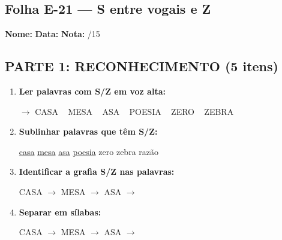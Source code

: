 \subsection{Folha E-21 --- S entre vogais e Z}
\begin{exercicio}



\noindent\textbf{Nome:} \underline{\hspace{3.2cm}} \quad \textbf{Data:} \underline{\hspace{1.6cm}} \quad \textbf{Nota:} \underline{\hspace{0.9cm}}/15


\subsection*{PARTE 1: RECONHECIMENTO (5 itens)}

\begin{enumerate}

  \item \textbf{Ler palavras com S/Z em voz alta:}
  \begin{center}
  $\rightarrow$ CASA ~ MESA ~ ASA ~ POESIA ~ ZERO ~ ZEBRA
  \end{center}

  \item \textbf{Sublinhar palavras que têm S/Z:}

\begin{center}
  \uline{casa} \quad \uline{mesa} \quad \uline{asa} \quad \uline{poesia} \quad zero \quad zebra \quad razão
\end{center}

  \item \textbf{Identificar a grafia S/Z nas palavras:}
  \begin{center}
  CASA $\rightarrow$ \underline{\hspace{1cm}} \quad MESA $\rightarrow$ \underline{\hspace{1cm}} \quad ASA $\rightarrow$ \underline{\hspace{1cm}}
  \end{center}

  \item \textbf{Separar em sílabas:}
  \begin{center}
  CASA $\rightarrow$ \underline{\hspace{1.2cm}} \quad MESA $\rightarrow$ \underline{\hspace{1.2cm}} \quad ASA $\rightarrow$ \underline{\hspace{1.2cm}}
  \end{center}


\end{enumerate}
\end{exercicio}
